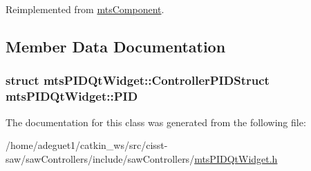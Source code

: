 Reimplemented from \hyperlink{classmts_component_aaf28f0262b44eb6866e10089a02fa6e4}{mts\-Component}.



\subsection{Member Data Documentation}
\hypertarget{classmts_p_i_d_qt_widget_afbe0f5cdbb689de97e9489b92c1d2576}{
\subsubsection[{P\-I\-D}]{\setlength{\rightskip}{0pt plus 5cm}struct {\bf mts\-P\-I\-D\-Qt\-Widget\-::\-Controller\-P\-I\-D\-Struct}  mts\-P\-I\-D\-Qt\-Widget\-::\-P\-I\-D\hspace{0.3cm}{\ttfamily [protected]}}}\label{classmts_p_i_d_qt_widget_afbe0f5cdbb689de97e9489b92c1d2576}


The documentation for this class was generated from the following file\-:\begin{DoxyCompactItemize}
\item 
/home/adeguet1/catkin\-\_\-ws/src/cisst-\/saw/saw\-Controllers/include/saw\-Controllers/\hyperlink{mts_p_i_d_qt_widget_8h}{mts\-P\-I\-D\-Qt\-Widget.\-h}\end{DoxyCompactItemize}
